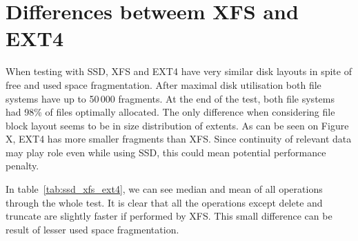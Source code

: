 \documentclass[
  color, %
  table, %
  lof,   %
  lot,   %
]{fithesis3}
\begin{document}
\section{Differences betweem XFS and EXT4}


When testing with SSD, XFS and EXT4 have very similar disk layouts in spite of free and used space fragmentation. After maximal disk utilisation both file systems have up to 50\,000 fragments. At the end of the test, both file systems had 98\% of files optimally allocated. The only difference when considering file block layout seems to be in size distribution of extents. As can be seen on Figure X, EXT4 has more smaller fragments than XFS. Since continuity of relevant data may play role even while using SSD, this could mean potential performance penalty.

In table~\ref{tab:ssd_xfs_ext4}, we can see median and mean of all operations through the whole test. It is clear that all the operations except delete and truncate are slightly faster if performed by XFS. This small difference can be result of lesser used space fragmentation.
\end{document}
